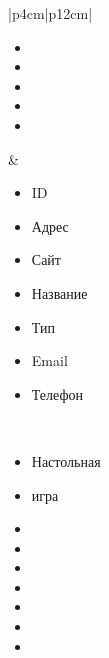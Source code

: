\begin{table}[h!]
\begin{center}
\begin{threeparttable}
\begin{tabular}{|p{4cm}|p{12cm}|}
\begin{minipage}[t]{\linewidth}
\begin{multicols}{1}
\begin{itemize}[leftmargin=0mm,labelsep=0mm,nosep,after=\strut]
                  \item[]
                  \item[]
                  \item[]
                  \item[]
                  \item[]
                \end{itemize}
              \end{multicols}
            \end{minipage}
          & \begin{minipage}[t]{\linewidth}
              \begin{multicols}{2}
                \begin{itemize}[leftmargin=0mm,labelsep=0mm,nosep,after=\strut]
                  \item[] ID
                  \item[] Адрес
                  \item[] Сайт
                  \item[] Название
                  \item[] Тип
                  \item[] Email
                  \item[] Телефон
                \end{itemize}
              \end{multicols}
            \end{minipage}\\
            \hline
            \begin{minipage}[t]{\linewidth}
              \begin{multicols}{1}
                \begin{itemize}[leftmargin=0mm,labelsep=0mm,nosep,after=\strut]
                  \item[] Настольная
                  \item[] игра
                  \item[]
                  \item[]
                  \item[]
                  \item[]
                  \item[]
                  \item[]
                  \item[]
                \end{itemize}
              \end{multicols}

\end{minipage}
\end{tabular}
\end{threeparttable}
\end{center}
\end{table}
